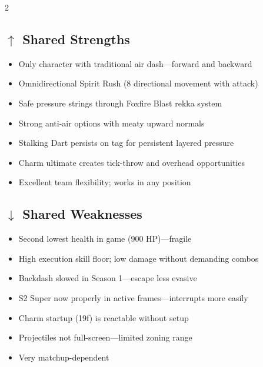 \documentclass[12pt, a4paper]{report}
\newcommand{\faArrowUp}{$\uparrow$}
\newcommand{\faArrowDown}{$\downarrow$}
\begin{document}
\setlength{\columnseprule}{0.4pt}\renewcommand{\columnseprulecolor}{\color{ahriBlue!40}}
\begin{multicols}{2}

\subsection*{\textcolor{ahriGreen}{\faArrowUp\; Shared Strengths}}
\begin{itemize}[leftmargin=*,itemsep=2pt]
  \item Only character with traditional air dash---forward and backward
  \item Omnidirectional Spirit Rush (8 directional movement with attack)
  \item Safe pressure strings through Foxfire Blast rekka system
  \item Strong anti-air options with meaty upward normals
  \item Stalking Dart persists on tag for persistent layered pressure
  \item Charm ultimate creates tick-throw and overhead opportunities
  \item Excellent team flexibility; works in any position
\end{itemize}

\columnbreak

\subsection*{\textcolor{ahriRed}{\faArrowDown\; Shared Weaknesses}}
\begin{itemize}[leftmargin=*,itemsep=2pt]
  \item Second lowest health in game (900 HP)---fragile
  \item High execution skill floor; low damage without demanding combos
  \item Backdash slowed in Season 1---escape less evasive
  \item S2 Super now properly in active frames---interrupts more easily
  \item Charm startup (19f) is reactable without setup
  \item Projectiles not full-screen---limited zoning range
  \item Very matchup-dependent
\end{itemize}

\end{multicols}

\clearpage
\end{document}

